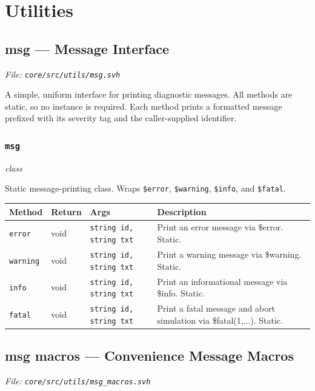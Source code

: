\documentclass[11pt,letterpaper]{report}
\begin{document}
\chapter{Utilities}
\section{msg --- Message Interface}
\noindent\small\textit{File: \texttt{core/src/utils/msg.svh}}\par

A simple, uniform interface for printing diagnostic messages. All methods are static, so no instance is required. Each method prints a formatted message prefixed with its severity tag and the caller-supplied identifier.

\subsection*{\texttt{msg}}
\noindent\small\textit{class}\par

Static message-printing class. Wraps \texttt{\$error}, \texttt{\$warning}, \texttt{\$info}, and \texttt{\$fatal}.

\begin{xltabular}{\linewidth}{>{\small}p{1.35in} >{\small}p{1.25in} >{\small}p{0.95in} >{\small}X}
\toprule
\textbf{Method} & \textbf{Return} & \textbf{Args} & \textbf{Description} \\
\midrule
\endhead
\bottomrule
\endfoot
\texttt{error} & void & \texttt{string id, string txt} & Print an error message via \$error. Static. \\
\texttt{warning} & void & \texttt{string id, string txt} & Print a warning message via \$warning. Static. \\
\texttt{info} & void & \texttt{string id, string txt} & Print an informational message via \$info. Static. \\
\texttt{fatal} & void & \texttt{string id, string txt} & Print a fatal message and abort simulation via \$fatal(1,...). Static. \\
\end{xltabular}

\section{msg macros --- Convenience Message Macros}
\noindent\small\textit{File: \texttt{core/src/utils/msg\_macros.svh}}\par
\end{document}
